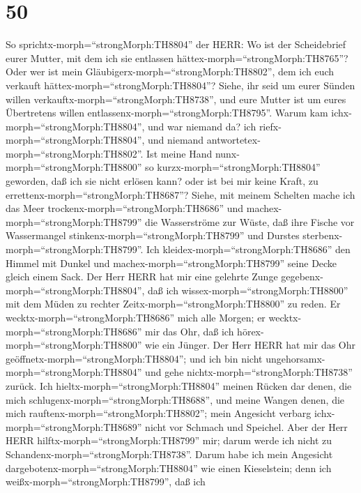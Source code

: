 \hypertarget{section-49}{%
\section{50}\label{section-49}}

 So sprichtx-morph=``strongMorph:TH8804'' der HERR: Wo ist
der Scheidebrief eurer Mutter, mit dem ich sie entlassen
hättex-morph=``strongMorph:TH8765''? Oder wer ist mein
Gläubigerx-morph=``strongMorph:TH8802'', dem ich euch verkauft
hättex-morph=``strongMorph:TH8804''? Siehe, ihr seid um eurer Sünden
willen verkauftx-morph=``strongMorph:TH8738'', und eure Mutter ist um
eures Übertretens willen entlassenx-morph=``strongMorph:TH8795''.
 Warum kam ichx-morph=``strongMorph:TH8804'', und war
niemand da? ich riefx-morph=``strongMorph:TH8804'', und niemand
antwortetex-morph=``strongMorph:TH8802''. Ist meine Hand
nunx-morph=``strongMorph:TH8800'' so kurzx-morph=``strongMorph:TH8804''
geworden, daß ich sie nicht erlösen kann? oder ist bei mir keine Kraft,
zu errettenx-morph=``strongMorph:TH8687''? Siehe, mit meinem Schelten
mache ich das Meer trockenx-morph=``strongMorph:TH8686'' und
machex-morph=``strongMorph:TH8799'' die Wasserströme zur Wüste, daß ihre
Fische vor Wassermangel stinkenx-morph=``strongMorph:TH8799'' und
Durstes sterbenx-morph=``strongMorph:TH8799''.  Ich
kleidex-morph=``strongMorph:TH8686'' den Himmel mit Dunkel und
machex-morph=``strongMorph:TH8799'' seine Decke gleich einem Sack.
 Der Herr HERR hat mir eine gelehrte Zunge
gegebenx-morph=``strongMorph:TH8804'', daß ich
wissex-morph=``strongMorph:TH8800'' mit dem Müden zu rechter
Zeitx-morph=``strongMorph:TH8800'' zu reden. Er
wecktx-morph=``strongMorph:TH8686'' mich alle Morgen; er
wecktx-morph=``strongMorph:TH8686'' mir das Ohr, daß ich
hörex-morph=``strongMorph:TH8800'' wie ein Jünger.  Der Herr
HERR hat mir das Ohr geöffnetx-morph=``strongMorph:TH8804''; und ich bin
nicht ungehorsamx-morph=``strongMorph:TH8804'' und gehe
nichtx-morph=``strongMorph:TH8738'' zurück.  Ich
hieltx-morph=``strongMorph:TH8804'' meinen Rücken dar denen, die mich
schlugenx-morph=``strongMorph:TH8688'', und meine Wangen denen, die mich
rauftenx-morph=``strongMorph:TH8802''; mein Angesicht verbarg
ichx-morph=``strongMorph:TH8689'' nicht vor Schmach und Speichel.
 Aber der Herr HERR hilftx-morph=``strongMorph:TH8799'' mir;
darum werde ich nicht zu Schandenx-morph=``strongMorph:TH8738''. Darum
habe ich mein Angesicht dargebotenx-morph=``strongMorph:TH8804'' wie
einen Kieselstein; denn ich weißx-morph=``strongMorph:TH8799'', daß ich
